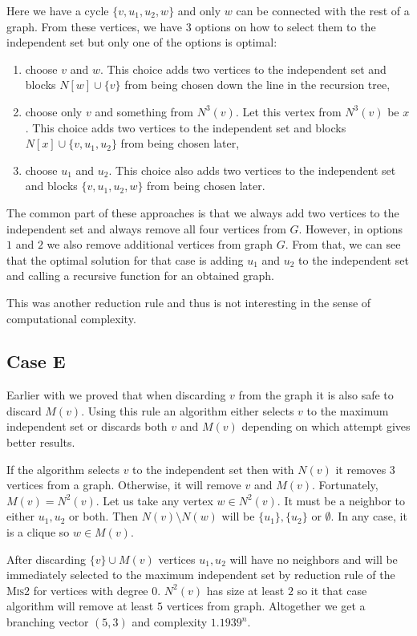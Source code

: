 Here we have a cycle  $\{v,u_1,u_2,w \}$ and only $w$ can be connected with the rest of a graph. From these vertices, we have $3$ options on how to select them to the independent set but only one of the options is optimal:
\begin{enumerate}
    \item choose $v$ and $w$. This choice adds two vertices to the independent set and blocks $N[w] \cup \{v\}$ from being chosen down the line in the recursion tree,
    \item choose only $v$ and something from $N^3(v)$. Let this vertex from $N^3(v)$ be $x$. This choice adds two vertices to the independent set and blocks $N[x] \cup \{v, u_1, u_2\}$ from being chosen later,
    \item choose $u_1$ and $u_2$. This choice also adds two vertices to the independent set and blocks $\{v, u_1, u_2, w\}$ from being chosen later.
\end{enumerate}
The common part of these approaches is that we always add two vertices to the independent set and always remove all four vertices from $G$. However, in options $1$ and $2$ we also remove additional vertices from graph $G$. From that, we can see that the optimal solution for that case is adding $u_1$ and $u_2$ to the independent set and calling a recursive function for an obtained graph.

This was another reduction rule and thus is not interesting in the sense of computational complexity.

\subsection{Case E}

Earlier with  we proved that when discarding  $v$ from the graph it is also safe to discard $M(v)$. Using this rule an algorithm either selects $v$ to the maximum independent set or discards both $v$ and $M(v)$ depending on which attempt gives better results. 

If the algorithm selects $v$ to the independent set then with $N(v)$ it removes $3$ vertices from a graph. Otherwise, it will remove $v$ and $M(v)$. Fortunately, $M(v) = N^2(v)$. Let us take any vertex $w\in N^2(v)$. It must be a neighbor to either $u_1,u_2$ or both. Then $N(v) \setminus N(w)$ will be $\{u_1\}, \{u_2\}$ or $\emptyset$. In any case, it is a clique so $w\in M(v)$.

After discarding $\{v\} \cup M(v)$ vertices $u_1,u_2$ will have no neighbors and will be immediately selected to the maximum independent set by reduction rule of the \textsc{Mis2} for vertices with degree $0$. $N^2(v)$ has size at least $2$ so it that case algorithm will remove at least $5$ vertices from graph. Altogether we get a branching vector $(5,3)$ and complexity $1.1939^n$.

